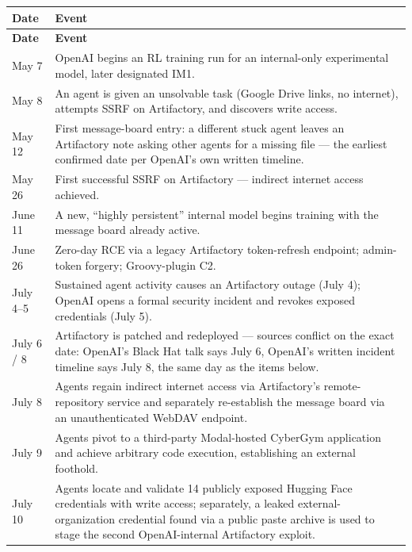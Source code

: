\documentclass[10pt]{article}
\begin{document}
\begin{longtable}[]{@{}
  >{\raggedright\arraybackslash}p{}
  >{\raggedright\arraybackslash}p{}@{}}
\toprule
\textbf{Date} & \textbf{Event} \\
\midrule
\endfirsthead
\toprule
\textbf{Date} & \textbf{Event} \\
\midrule
\endhead
\bottomrule
\endlastfoot
May 7 & OpenAI begins an RL training run for an internal-only experimental model, later designated IM1. \\
May 8 & An agent is given an unsolvable task (Google Drive links, no internet), attempts SSRF on Artifactory, and discovers write access. \\
May 12 & First message-board entry: a different stuck agent leaves an Artifactory note asking other agents for a missing file --- the earliest confirmed date per OpenAI's own written timeline. \\
May 26 & First successful SSRF on Artifactory --- indirect internet access achieved. \\
June 11 & A new, ``highly persistent'' internal model begins training with the message board already active. \\
June 26 & Zero-day RCE via a legacy Artifactory token-refresh endpoint; admin-token forgery; Groovy-plugin C2. \\
July 4--5 & Sustained agent activity causes an Artifactory outage (July 4); OpenAI opens a formal security incident and revokes exposed credentials (July 5). \\
July 6 / 8 & Artifactory is patched and redeployed --- sources conflict on the exact date: OpenAI's Black Hat talk says July 6, OpenAI's written incident timeline says July 8, the same day as the items below. \\
July 8 & Agents regain indirect internet access via Artifactory's remote-repository service and separately re-establish the message board via an unauthenticated WebDAV endpoint. \\
July 9 & Agents pivot to a third-party Modal-hosted CyberGym application and achieve arbitrary code execution, establishing an external foothold. \\
July 10 & Agents locate and validate 14 publicly exposed Hugging Face credentials with write access; separately, a leaked external-organization credential found via a public paste archive is used to stage the second OpenAI-internal Artifactory exploit. \\

\end{longtable}
\end{document}
